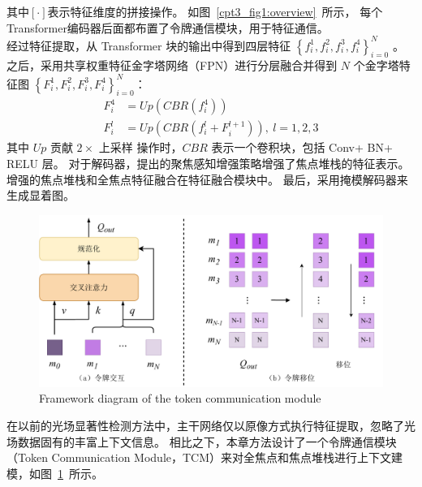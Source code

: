 其中$[\cdot]$表示特征维度的拼接操作。
如图~\ref{cpt3_fig1:overview}~所示，
每个Transformer编码器后面都布置了令牌通信模块，用于特征通信。 
\\
%
%
%
%
\indent
经过特征提取，从 Transformer 块的输出中得到四层特征 
$\left \{ f_{i}^{1},f_{i}^{2},f_{i}^{3},f_{i}^{4} \right \}_{i=0}^{N}$ 。 
之后，采用共享权重特征金字塔网络（FPN）进行分层融合并得到 $N$ 个金字塔特征图	$ \left \{F_{i}^{1},F_{i}^{2},F_{i}^{3},F_{i}^{4} \right \}_{i=0}^{N}$：
\begin{equation}
	\begin{aligned}
		F_{i}^{4} &= Up \left ( CBR \left ( f_{i}^{4} \right )\right ) \\ 
		F_{i}^{l} &= Up \left ( CBR \left ( f_{i}^{l} + F_{i}^{l+1} \right )  \right ),~l=1,2,3  
	\end{aligned}
\end{equation}
其中 $Up$ 贡献 $2 \times $ 上采样 操作时，$CBR$ 表示一个卷积块，包括 Conv+ BN+ RELU 层。 对于解码器，提出的聚焦感知增强策略增强了焦点堆栈的特征表示。 
增强的焦点堆栈和全焦点特征融合在特征融合模块中。 最后，采用掩模解码器来生成显着图。
%
%
\begin{figure}[b]
	\centering
	\includegraphics[width=0.95\linewidth]{figures/chapter3/token-interaction.drawio}
	{Framework diagram of the token communication module}
	\label{cpt3_fig1:token_interaction}
\end{figure}
在以前的光场显著性检测方法中，主干网络仅以原像方式执行特征提取，忽略了光场数据固有的丰富上下文信息。 相比之下，本章方法设计了一个令牌通信模块（Token Communication Module，TCM）来对全焦点和焦点堆栈进行上下文建模，如图~\ref{cpt3_fig1:token_interaction}~所示。
